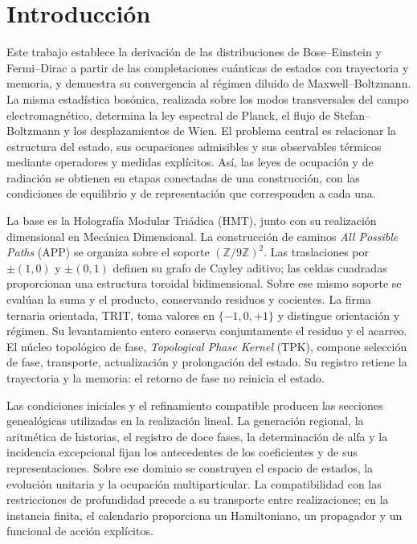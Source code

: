 \section*{Introducción}
{}
\label{v:presentacion}
Este trabajo establece la derivación de las distribuciones de
Bose--Einstein y Fermi--Dirac a partir de las completaciones cuánticas de
estados con trayectoria y memoria, y demuestra su convergencia al régimen
diluido de Maxwell--Boltzmann. La misma estadística bosónica, realizada
sobre los modos transversales del campo electromagnético, determina la
ley espectral de Planck, el flujo de Stefan--Boltzmann y los
desplazamientos de Wien. El problema central es relacionar la estructura
del estado, sus ocupaciones admisibles y sus observables térmicos mediante
operadores y medidas explícitos. Así, las leyes de ocupación y de
radiación se obtienen en etapas conectadas de una construcción, con las
condiciones de equilibrio y de representación que corresponden a cada una.

La base es la Holografía Modular Triádica (HMT), junto con su realización
dimensional en Mecánica Dimensional. La construcción de caminos
\emph{All Possible Paths} (APP) se organiza sobre el soporte
\((\mathbb Z/9\mathbb Z)^2\). Las traslaciones por
\(\pm(1,0)\) y \(\pm(0,1)\) definen su grafo de Cayley aditivo;
las celdas cuadradas proporcionan una estructura toroidal bidimensional.
Sobre ese mismo soporte se evalúan la suma y el producto, conservando
residuos y cocientes. La firma ternaria orientada, TRIT, toma valores
en \(\{-1,0,+1\}\) y distingue orientación y régimen. Su levantamiento
entero conserva conjuntamente el residuo y el acarreo. El núcleo
topológico de fase, \emph{Topological Phase Kernel}
(TPK), compone selección de fase, transporte, actualización y
prolongación del estado. Su registro retiene la trayectoria y la memoria:
el retorno de fase no reinicia el estado.

Las condiciones iniciales y el refinamiento compatible producen las
secciones genealógicas utilizadas en la realización lineal. La
generación regional, la aritmética de historias, el registro de doce fases,
la determinación de alfa y la incidencia excepcional fijan los
antecedentes de los coeficientes y de sus representaciones. Sobre ese
dominio se construyen el espacio de estados, la evolución unitaria y la
ocupación multiparticular. La compatibilidad con las restricciones de
profundidad precede a su transporte entre realizaciones; en la instancia
finita, el calendario proporciona un Hamiltoniano, un propagador y un
funcional de acción explícitos.

